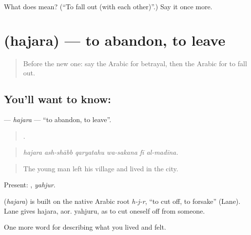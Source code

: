 \begin{tcolorbox}[breakable,colback=teal!4,colframe=teal!35!black,title={Before you move on}]
What does  mean? (\textquotedblleft{}To fall out (with each other)\textquotedblright{}.) Say it once more.
\end{tcolorbox}
\section[\texorpdfstring{\ar{هجر} (hajara)}{هجر (hajara)}]{ (hajara) — to abandon, to leave}

\label{lesson:AR-C535-hajara}



\begin{quote}
Before the new one: say the Arabic for betrayal, then the Arabic for to fall out.
\end{quote}

\subsection*{You'll want to know: }
\textbf{} — \emph{hajara} — \textquotedblleft{}to abandon, to leave\textquotedblright{}.

\begin{quote}
     .
\end{quote}

\begin{quote}
\emph{hajara ash-shābb qaryatahu wa-sakana fī al-madīna.}
\end{quote}

\begin{quote}
The young man left his village and lived in the city.
\end{quote}

Present: , \emph{yahjur}.

\begin{cousinweb}
\textbf{} (\emph{hajara}) is built on the native Arabic root \emph{h-j-r}, \textquotedblleft{}to cut off, to forsake\textquotedblright{} (Lane). Lane gives hajara, aor. yahjuru, as to cut oneself off from someone.
\end{cousinweb}

\begin{grammarlens}[title={What you've built}]
One more word for describing what you lived and felt.
\end{grammarlens}

